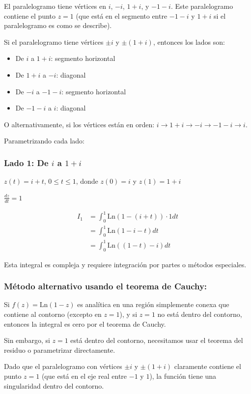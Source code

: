 \documentclass{article}
\begin{document}
El paralelogramo tiene vértices en $i$, $-i$, $1+i$, y $-1-i$. Este paralelogramo contiene el punto $z = 1$ (que está en el segmento entre $-1-i$ y $1+i$ si el paralelogramo es como se describe).

Si el paralelogramo tiene vértices $\pm i$ y $\pm(1+i)$, entonces los lados son:
\begin{itemize}
\item De $i$ a $1+i$: segmento horizontal
\item De $1+i$ a $-i$: diagonal
\item De $-i$ a $-1-i$: segmento horizontal
\item De $-1-i$ a $i$: diagonal
\end{itemize}

O alternativamente, si los vértices están en orden: $i \to 1+i \to -i \to -1-i \to i$.

Parametrizando cada lado:

\subsubsection*{Lado 1: De $i$ a $1+i$}

$z(t) = i + t$, $0 \leq t \leq 1$, donde $z(0) = i$ y $z(1) = 1+i$

$\frac{dz}{dt} = 1$

\begin{align*}
I_1 &= \int_0^1 \text{Ln}(1 - (i + t)) \cdot 1 dt \\
    &= \int_0^1 \text{Ln}(1 - i - t) dt \\
    &= \int_0^1 \text{Ln}((1 - t) - i) dt
\end{align*}

Esta integral es compleja y requiere integración por partes o métodos especiales.

\subsubsection*{Método alternativo usando el teorema de Cauchy:}

Si $f(z) = \text{Ln}(1 - z)$ es analítica en una región simplemente conexa que contiene al contorno (excepto en $z = 1$), y si $z = 1$ no está dentro del contorno, entonces la integral es cero por el teorema de Cauchy.

Sin embargo, si $z = 1$ está dentro del contorno, necesitamos usar el teorema del residuo o parametrizar directamente.

Dado que el paralelogramo con vértices $\pm i$ y $\pm(1+i)$ claramente contiene el punto $z = 1$ (que está en el eje real entre $-1$ y $1$), la función tiene una singularidad dentro del contorno.
\end{document}
